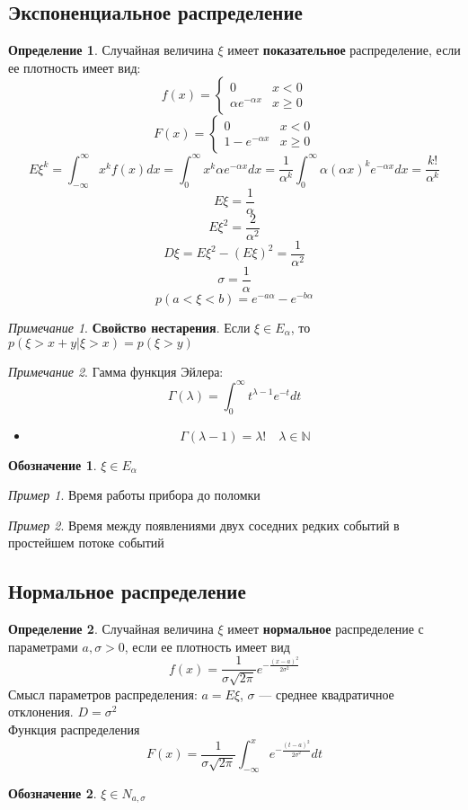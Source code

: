 \documentclass[english]{article}
\newcommand{\N}{\mathbb{N}}
\theoremstyle{plain}
\theoremstyle{remark}
\newtheorem*{remark}{Примечание}
\newtheorem*{examp}{Пример}
\theoremstyle{definition}
\newtheorem*{definition}{Определение}
\newtheorem*{symb}{Обозначение}
\begin{document}
\subsection{Экспоненциальное распределение}
\label{sec:orga7acb1e}
\begin{definition}
Случайная величина \(\xi\) имеет \textbf{показательное} распределение, если ее плотность имеет вид:
\[ f(x) = \begin{cases}
0 & x < 0 \\
\alpha e^{- \alpha x} & x \ge 0
\end{cases}\]
\[ F(x) = \begin{cases}
0 & x < 0 \\
1 - e^{-\alpha x} & x \ge 0
\end{cases}\]
\[ E\xi^k = \int_{-\infty}^\infty x^k f(x) dx = \int_0^\infty x^k \alpha e^{-\alpha x} dx = \frac{1}{\alpha^k} \int_0^\infty \alpha (\alpha x)^ke^{-\alpha x} dx = \frac{k!}{\alpha^k} \]
\[ E\xi = \frac{1}{\alpha} \]
\[ E\xi^2 = \frac{2}{\alpha^2} \]
\[ D\xi = E\xi^2 - (E\xi)^2 = \frac{1}{\alpha^2} \]
\[ \sigma = \frac{1}{\alpha} \]
\[ p(a < \xi < b) = e^{-a\alpha} - e^{- b\alpha} \]
\end{definition}
\begin{remark}
\textbf{Свойство нестарения}. Если \(\xi \in E_\alpha\), то \(p(\xi > x + y | \xi > x) = p(\xi > y)\)
\end{remark}

\begin{remark}
Гамма функция Эйлера:
\[ \Gamma(\lambda) = \int_0^\infty t^{\lambda - 1} e^{-t} dt \]
\begin{itemize}
\item \[ \Gamma(\lambda - 1) = \lambda! \quad \lambda \in \N \]
\end{itemize}
\end{remark}
\begin{symb}
\(\xi \in E_\alpha\)
\end{symb}
\begin{examp}
Время работы прибора до поломки
\end{examp}
\begin{examp}
Время между появлениями двух соседних редких событий в простейшем потоке событий
\end{examp}
\subsection{Нормальное распределение}
\label{sec:orgb81019f}
\begin{definition}
Случайная величина \(\xi\) имеет \textbf{нормальное} распределение с параметрами \(a, \sigma > 0\), если ее плотность имеет вид
\[ f(x) = \frac{1}{\sigma\sqrt{2\pi}}e^{-\frac{(x - a)^2}{2\sigma^2}}\]
Смысл параметров распределения: \(a = E\xi\), \(\sigma\) --- среднее квадратичное отклонения. \(D = \sigma^2\) \\
Функция распределения
\[ F(x) = \frac{1}{\sigma\sqrt{2\pi}} \int_{-\infty}^x e^{-\frac{(t - a)^2}{2\sigma^2}} dt \]
\end{definition}
\begin{symb}
\(\xi \in N_{a, \sigma}\)
\end{symb}
\end{document}
